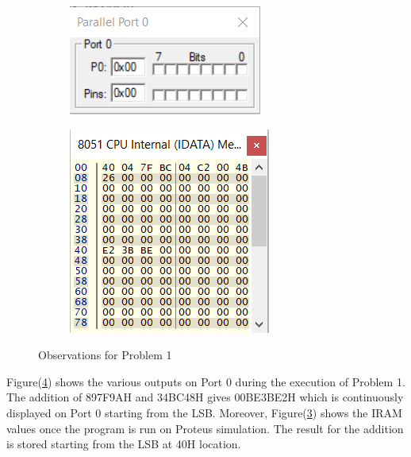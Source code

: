 \documentclass{lab_sheet}
\begin{document}
\begin{figure}[H]
\begin{subfigure}{.5\textwidth}
  \label{fig:prob1-c}
  \caption{}
\end{subfigure}
\begin{subfigure}{.5\textwidth}
  \centering
  \includegraphics[frame,width=.8\linewidth]{../Figures/1_1_d.png}   
  \caption{}
  \label{fig:prob1-d}
\end{subfigure}
\newline
\hspace*{\fill}
\begin{subfigure}{.5\textwidth}
  \centering
  \includegraphics[frame,width=.8\linewidth]{../Figures/1_1_e.png}   
  \caption{}
  \label{fig:prob1-e}
\end{subfigure}
\hspace*{\fill}
\caption{Observations for Problem 1}
\label{fig:prob1}
\end{figure}
Figure(\ref{fig:prob1}) shows the various outputs on Port 0 during the execution of Problem 1. The addition of 897F9AH and 34BC48H gives 00BE3BE2H which is continuously displayed on Port 0 starting from the LSB. Moreover, Figure(\ref{fig:prob1-e}) shows the IRAM values once the program is run on Proteus simulation. The result for the addition is stored starting from the LSB at 40H location. 
\end{document}
